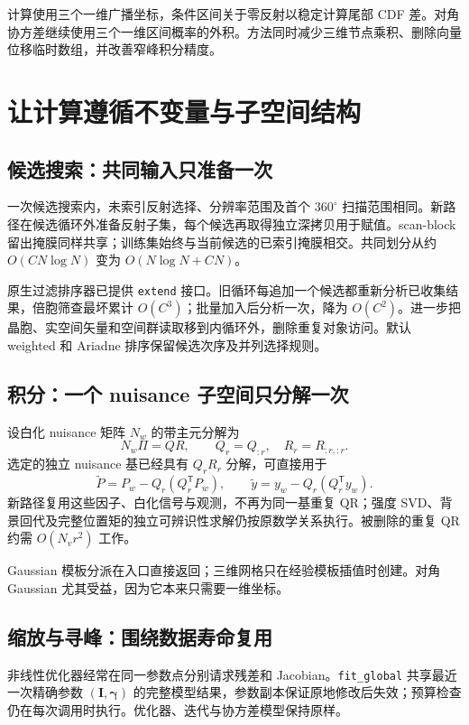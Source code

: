 \documentclass[UTF8,11pt,a4paper,fontset=fandol]{ctexart}
\newcommand{\T}{\mathsf{T}}
\newcommand{\code}[1]{\nolinkurl{#1}}
\begin{document}
计算使用三个一维广播坐标，条件区间关于零反射以稳定计算尾部 CDF 差。对角协方差继续使用三个一维区间概率的外积。方法同时减少三维节点乘积、删除向量位移临时数组，并改善窄峰积分精度。

\section{让计算遵循不变量与子空间结构}
\subsection{候选搜索：共同输入只准备一次}
一次候选搜索内，未索引反射选择、分辨率范围及首个 $360^\circ$ 扫描范围相同。新路径在候选循环外准备反射子集，每个候选再取得独立深拷贝用于赋值。scan-block 留出掩膜同样共享；训练集始终与当前候选的已索引掩膜相交。共同划分从约 $O(CN\log N)$ 变为 $O(N\log N+CN)$。

原生过滤排序器已提供 \code{extend} 接口。旧循环每追加一个候选都重新分析已收集结果，倍胞筛查最坏累计 $O(C^3)$；批量加入后分析一次，降为 $O(C^2)$。进一步把晶胞、实空间矢量和空间群读取移到内循环外，删除重复对象访问。默认 weighted 和 Ariadne 排序保留候选次序及并列选择规则。

\subsection{积分：一个 nuisance 子空间只分解一次}
设白化 nuisance 矩阵 $N_w$ 的带主元分解为
\begin{equation}
N_w\Pi=QR,\qquad Q_r=Q_{:r},\quad R_r=R_{:r,:r}.
\end{equation}
选定的独立 nuisance 基已经具有 $Q_rR_r$ 分解，可直接用于
\begin{equation}
\widetilde P=P_w-Q_r(Q_r^{\T}P_w),\qquad
\widetilde y=y_w-Q_r(Q_r^{\T}y_w).
\end{equation}
新路径复用这些因子、白化信号与观测，不再为同一基重复 QR；强度 SVD、背景回代及完整位置矩的独立可辨识性求解仍按原数学关系执行。被删除的重复 QR 约需 $O(N_vr^2)$ 工作。

Gaussian 模板分派在入口直接返回；三维网格只在经验模板插值时创建。对角 Gaussian 尤其受益，因为它本来只需要一维坐标。

\subsection{缩放与寻峰：围绕数据寿命复用}
非线性优化器经常在同一参数点分别请求残差和 Jacobian。\code{fit_global} 共享最近一次精确参数 $(\bm I,\bm\gamma)$ 的完整模型结果，参数副本保证原地修改后失效；预算检查仍在每次调用时执行。优化器、迭代与协方差模型保持原样。
\end{document}

